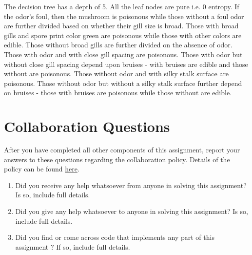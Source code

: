 \documentclass[11pt,addpoints,answers]{exam}
\begin{document}
\begin{questions}
    \begin{your_solution}[title=Answer,height=5cm,width=15cm]
The decision tree has a depth of 5. All the leaf nodes are pure i.e. 0 entropy.\newline
	If the odor's foul, then the mushroom is poisonous while those without a foul odor are further divided based on whether their gill size is broad.
Those with broad gills and spore print color green are poisonous while those with other colors are edible.
Those without broad gills are further divided on the absence of odor. Those with odor and with close gill spacing are poisonous. Those with odor but without close gill spacing depend upon bruises - with bruises are edible and those without are poisonous. Those without odor and with silky stalk surface are poisonous. Those without odor but without a silky stalk surface further depend on bruises - those with bruises are poisonous while those without are edible.
    \end{your_solution}
    
\end{questions}

\newpage

\section{Collaboration Questions}
After you have completed all other components of this assignment, report your answers to these questions regarding the collaboration policy. Details of the policy can be found \href{http://www.cs.cmu.edu/~mgormley/courses/10601/about.html}{here}.
\begin{enumerate}
    \item Did you receive any help whatsoever from anyone in solving this assignment? Is so, include full details.
    \item Did you give any help whatsoever to anyone in solving this assignment? Is so, include full details.
    \item Did you find or come across code that implements any part of this assignment ? If so, include full details.
\end{enumerate}
\end{document}
